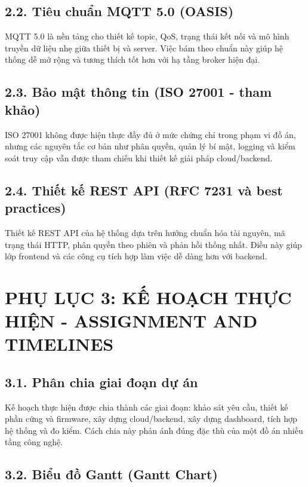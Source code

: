 \documentclass[a4paper]{extarticle}
\newcommand{\appendixsection}[1]{\clearpage\section{#1}}
\begin{document}
\subsection{2.2. Tiêu chuẩn MQTT 5.0
(OASIS)}\label{22-tiuxeau-chuux1ea9n-mqtt-50-oasis}

MQTT 5.0 là nền tảng cho thiết kế topic, QoS, trạng thái kết nối và mô hình truyền dữ liệu nhẹ giữa thiết bị và server. Việc bám theo chuẩn này giúp hệ thống dễ mở rộng và tương thích tốt hơn với hạ tầng broker hiện đại.

\subsection{2.3. Bảo mật thông tin (ISO 27001 - tham
khảo)}\label{23-bux1ea3o-mux1eadt-thuxf4ng-tin-iso-27001---tham-khux1ea3o}

ISO 27001 không được hiện thực đầy đủ ở mức chứng chỉ trong phạm vi đồ án, nhưng các nguyên tắc cơ bản như phân quyền, quản lý bí mật, logging và kiểm soát truy cập vẫn được tham chiếu khi thiết kế giải pháp cloud/backend.

\subsection{2.4. Thiết kế REST API (RFC 7231 và best
practices)}\label{24-thiux1ebft-kux1ebf-rest-api-rfc-7231-vuxe0-best-practices}

Thiết kế REST API của hệ thống dựa trên hướng chuẩn hóa tài nguyên, mã trạng thái HTTP, phân quyền theo phiên và phản hồi thống nhất. Điều này giúp lớp frontend và các công cụ tích hợp làm việc dễ dàng hơn với backend.

\appendixsection{PHỤ LỤC 3: KẾ HOẠCH THỰC HIỆN - ASSIGNMENT AND
TIMELINES}\label{phux1ee5-lux1ee5c-3-kux1ebf-houx1ea1ch-thux1ef1c-hiux1ec7n---assignment-and-timelines}

\subsection{3.1. Phân chia giai đoạn dự
án}\label{31-phuxe2n-chia-giai-ux111oux1ea1n-dux1ef1-uxe1n}

Kế hoạch thực hiện được chia thành các giai đoạn: khảo sát yêu cầu, thiết kế phần cứng và firmware, xây dựng cloud/backend, xây dựng dashboard, tích hợp hệ thống và đo kiểm. Cách chia này phản ánh đúng đặc thù của một đồ án nhiều tầng công nghệ.

\subsection{3.2. Biểu đồ Gantt (Gantt
Chart)}\label{32-biux1ec3u-ux111ux1ed3-gantt-gantt-chart}
\end{document}
